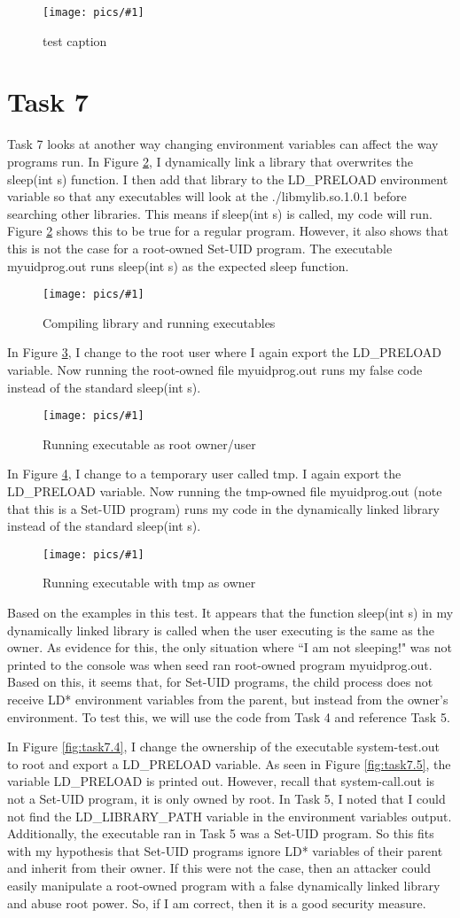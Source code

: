 \documentclass[11pt]{article}
\newcommand{\fig}[2]{ 
\begin{figure}[h]
	\centering
	\caption{#2}
	\texttt{[image: pics/\#1]}
	\label{fig:#1}
\end{figure} 
}
\begin{document}
\fig{task6}{test caption}

\newpage

\section*{Task 7}

Task 7 looks at another way changing environment variables can affect the way programs run.
In Figure \ref{fig:task7.1}, I dynamically link a library that overwrites the sleep(int s) function.
I then add that library to the LD\_PRELOAD environment variable so that any executables will look at the ./libmylib.so.1.0.1 before searching other libraries.
This means if sleep(int s) is called, my code will run.
Figure \ref{fig:task7.1} shows this to be true for a regular program.
However, it also shows that this is not the case for a root-owned Set-UID program.
The executable myuidprog.out runs sleep(int s) as the expected sleep function.

\fig{task7.1}{Compiling library and running executables}

In Figure \ref{fig:task7.2}, I change to the root user where I again export the LD\_PRELOAD variable. Now running the root-owned file myuidprog.out runs my false code instead of the standard sleep(int s). 

\fig{task7.2}{Running executable as root owner/user}

In Figure \ref{fig:task7.3}, I change to a temporary user called tmp. I again export the LD\_PRELOAD variable. Now running the tmp-owned file myuidprog.out (note that this is a Set-UID program) runs my code in the dynamically linked library instead of the standard sleep(int s). 

\fig{task7.3}{Running executable with tmp as owner}

Based on the examples in this test. It appears that the function sleep(int s) in my dynamically linked library is called when the user executing is the same as the owner. 
As evidence for this, the only situation where ``I am not sleeping!" was not printed to the console was when seed ran root-owned program myuidprog.out.
Based on this, it seems that, for Set-UID programs, the child process does not receive LD* environment variables from the parent, but instead from the owner's environment. To test this, we will use the code from Task 4 and reference Task 5. 

In Figure \ref{fig:task7.4}, I change the ownership of the executable system-test.out to root and export a LD\_PRELOAD variable. As seen in Figure \ref{fig:task7.5}, the variable LD\_PRELOAD is printed out. However, recall that system-call.out is not a Set-UID program, it is only owned by root.
In Task 5, I noted that I could not find the LD\_LIBRARY\_PATH variable in the environment variables output. Additionally, the executable ran in Task 5 was a Set-UID program. 
So this fits with my hypothesis that Set-UID programs ignore LD* variables of their parent and inherit from their owner. 
If this were not the case, then an attacker could easily manipulate a root-owned program with a false dynamically linked library and abuse root power.
So, if I am correct, then it is a good security measure.
\end{document}
